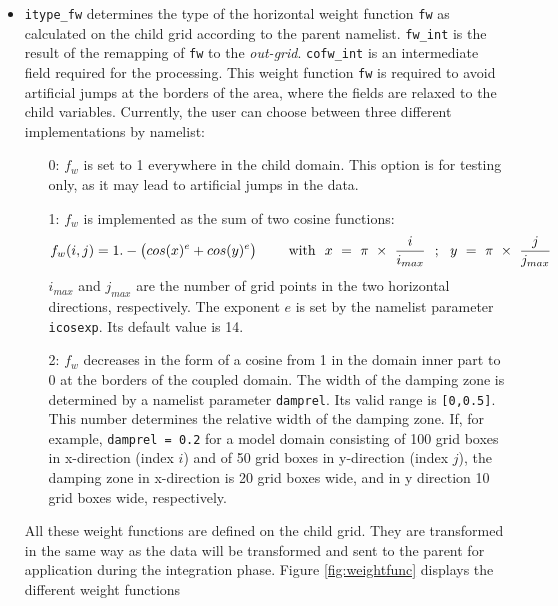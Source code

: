 \documentclass[11pt,twoside]{article}
\begin{document}
\begin{itemize}
\begin{itemize}
\item \verb|itype_fw| \label{descript:itype_fw} determines the type of the horizontal weight
function \verb|fw| as calculated on the child grid
according to the parent namelist. \verb|fw_int| is the result of the
remapping of \verb|fw| to the {\it out-grid}. \verb|cofw_int| is an
intermediate field required for the processing.
This weight function \verb|fw| is
  required to avoid artificial jumps at the borders of the area, where
  the fields are relaxed to the child variables. Currently, the user
  can choose between three different implementations by namelist:
\begin{itemize} %
\item[0:] $f_w$ is set to 1 everywhere in the child domain. This option
  is for testing only, as it may lead to artificial jumps in the
  data.
\item[1:] $f_w$ is implemented as the sum of two cosine functions:
\begin{eqnarray}
\label{wf}
 f_w(i,j) &= 1.- \big(cos(x)^{e} + cos(y)^{e}\big) %
~~~~&{\rm with}~~x~=~\pi~\times~\frac{i}{i_{max}}~~;~~y~=~\pi~\times~\frac{j}{j_{max}}
\end{eqnarray}
$i_{max}$ and $j_{max}$ are the number of grid points in the two horizontal
directions, respectively. The exponent $e$ is set by the namelist
parameter \verb|icosexp|. Its default value is 14.
\item[2:]  $f_w$ decreases in the form of a cosine from 1 in the domain
  inner part to 0 at the borders of the coupled domain. The width of
  the damping zone is determined by a namelist parameter \verb|damprel|.
  Its valid range is \verb|[0,0.5]|. This number determines
  the relative width of the damping zone. If, for example, 
  \verb|damprel = 0.2| for a model domain consisting of 100 grid boxes in
  x-direction (index $i$) and of 50 grid boxes in y-direction (index
  $j$), the damping zone in x-direction is 20 grid boxes wide,
  and in y direction 10 grid boxes wide, respectively. 
\end{itemize} %
All these weight functions are defined on the child grid.
They are transformed in the same way as the data will
be transformed and sent to the parent for application during the
integration phase. 
Figure \ref{fig:weightfunc} displays the different weight functions

\end{itemize}
\end{itemize}
\end{document}
